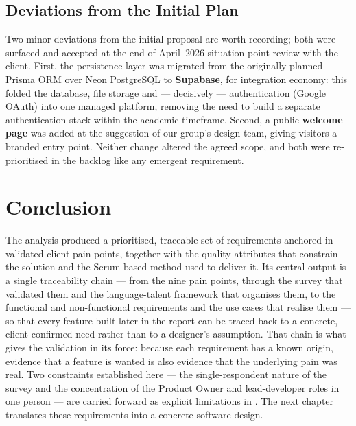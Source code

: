 \subsection{Deviations from the Initial Plan}
\label{sec:method-deviations}

Two minor deviations from the initial proposal are worth recording; both were
surfaced and accepted at the end-of-April~2026 situation-point review with the
client. First, the persistence layer was migrated from the originally planned
Prisma ORM over Neon PostgreSQL to \textbf{Supabase}, for integration economy:
this folded the database, file storage and --- decisively --- authentication
(Google OAuth) into one managed platform, removing the need to build a separate
authentication stack within the academic timeframe. Second, a public
\textbf{welcome page} was added at the suggestion of our group's design team,
giving visitors a branded entry point. Neither change altered the agreed scope,
and both were re-prioritised in the backlog like any emergent requirement.


\section{Conclusion}
\label{sec:analysis-conclusion}

The analysis produced a prioritised, traceable set of requirements anchored
in validated client pain points, together with the quality attributes that
constrain the solution and the Scrum-based method used to deliver it. Its
central output is a single traceability chain --- from the nine pain points,
through the survey that validated them and the language-talent framework that
organises them, to the functional and non-functional requirements and the use
cases that realise them --- so that every feature built later in the report can
be traced back to a concrete, client-confirmed need rather than to a designer's
assumption. That chain is what gives the validation in
 its force: because each requirement has a known
origin, evidence that a feature is wanted is also evidence that the underlying
pain was real. Two constraints established here --- the single-respondent
nature of the survey and the concentration of the Product Owner and
lead-developer roles in one person --- are carried forward as explicit
limitations in . The next chapter translates these
requirements into a concrete software design.
